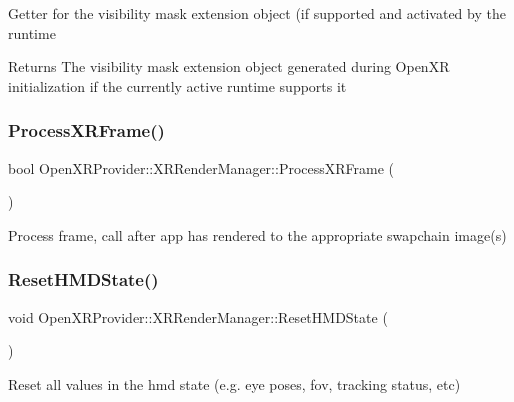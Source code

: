 Getter for the visibility mask extension object (if supported and activated by the runtime \begin{DoxyReturn}{Returns}
The visibility mask extension object generated during Open\+XR initialization if the currently active runtime supports it 
\end{DoxyReturn}
\mbox{\label{class_open_x_r_provider_1_1_x_r_render_manager_aebe4bca3de5bdec26ea4dfbc641273b5}} 
\subsubsection{\texorpdfstring{ProcessXRFrame()}{ProcessXRFrame()}}
{\footnotesize\ttfamily bool Open\+X\+R\+Provider\+::\+X\+R\+Render\+Manager\+::\+Process\+X\+R\+Frame (\begin{DoxyParamCaption}{ }\end{DoxyParamCaption})}



Process frame, call after app has rendered to the appropriate swapchain image(s) 

\mbox{\label{class_open_x_r_provider_1_1_x_r_render_manager_ab3dbed1a6e82b338e948def236adbf7b}} 
\subsubsection{\texorpdfstring{ResetHMDState()}{ResetHMDState()}}
{\footnotesize\ttfamily void Open\+X\+R\+Provider\+::\+X\+R\+Render\+Manager\+::\+Reset\+H\+M\+D\+State (\begin{DoxyParamCaption}{ }\end{DoxyParamCaption})\hspace{0.3cm}{\ttfamily [private]}}



Reset all values in the hmd state (e.\+g. eye poses, fov, tracking status, etc) 

\mbox{\label{class_open_x_r_provider_1_1_x_r_render_manager_ab9e9d2271f8c7e2740dad5e99c92343c}} 
